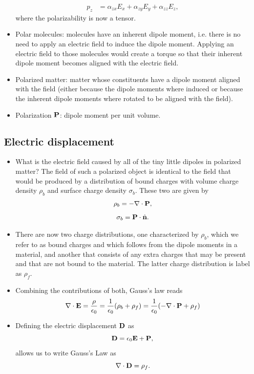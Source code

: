 \documentclass[a4paper,11pt]{report}
\begin{document}
\begin{itemize}
\begin{align}
         p_z &= \alpha_{zx} E_x + \alpha_{zy} E_y + \alpha_{zz} E_z,
    \end{align}
    where the polarizability is now a tensor.
    \item Polar molecules: molecules have an inherent dipole moment, i.e. there is no need to apply an electric field to induce the dipole moment. Applying an electric field to those molecules would create a torque so that their inherent dipole moment becomes aligned with the electric field.
    \item Polarized matter: matter whose constituents have a dipole moment aligned with the field (either because the dipole moments where induced or because the inherent dipole moments where rotated to be aligned with the field).
    \item Polarization $\mathbf{P}$: dipole moment per unit volume.
\end{itemize}
\subsection{Electric displacement}
\begin{itemize}
    \item What is the electric field caused by all of the tiny little dipoles in polarized matter? The field of such a polarized object is identical to the field that would be produced by a distribution of bound charges with volume charge density $\rho_b$ and surface charge density $\sigma_b$. These two are given by 
    \begin{equation}
        \rho_b = - \nabla \cdot \mathbf{P},
    \end{equation}
    \begin{equation}
        \sigma_b = \mathbf{P} \cdot \hat{\mathbf{n}}.
    \end{equation}
    \item There are now two charge distributions, one characterized by $\rho_b$, which we refer to as bound charges and which follows from the dipole moments in a material, and another that consists of any extra charges that may be present and that are not bound to the material. The latter charge distribution is label as $\rho_f$.
    \item Combining the contributions of both, Gauss's law reads
    \begin{equation}
        \nabla \cdot \mathbf{E} = \frac{\rho}{\epsilon_0} = \frac{1}{\epsilon_0}(\rho_b + \rho_f) = \frac{1}{\epsilon_0} (-\nabla \cdot \mathbf{P} + \rho_f)
    \end{equation}
    \item Defining the electric displacement $\mathbf{D}$ as 
    \begin{equation}
        \mathbf{D} = \epsilon_0 \mathbf{E} + \mathbf{P},
    \end{equation}
    allows us to write Gauss's Law as 
    \begin{equation}
        \nabla \cdot \mathbf{D} = \rho_f.
    \end{equation}
\end{itemize}
\end{document}
